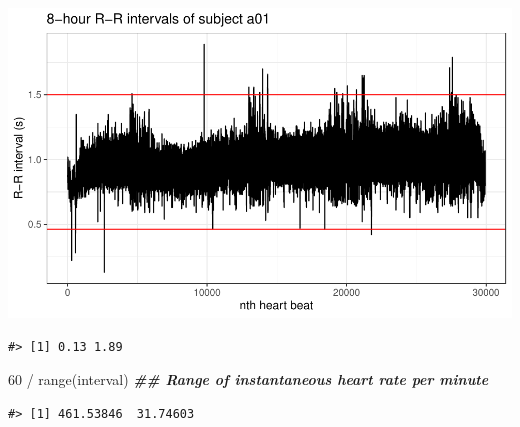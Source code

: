 \documentclass[
]{article}
\newenvironment{Shaded}{\begin{snugshade}}{\end{snugshade}}
\newcommand{\AttributeTok}[1]{\textcolor[rgb]{0.77,0.63,0.00}{#1}}
\newcommand{\DecValTok}[1]{\textcolor[rgb]{0.00,0.00,0.81}{#1}}
\newcommand{\DocumentationTok}[1]{\textcolor[rgb]{0.56,0.35,0.01}{\textbf{\textit{#1}}}}
\newcommand{\FunctionTok}[1]{\textcolor[rgb]{0.00,0.00,0.00}{#1}}
\newcommand{\NormalTok}[1]{#1}
\newcommand{\OtherTok}[1]{\textcolor[rgb]{0.56,0.35,0.01}{#1}}
\newcommand{\SpecialCharTok}[1]{\textcolor[rgb]{0.00,0.00,0.00}{#1}}
\begin{document}
\begin{center}\includegraphics{report_files/figure-latex/rr-interval-1} \end{center}

\begin{Shaded}
\end{Shaded}

\begin{verbatim}
#> [1] 0.13 1.89
\end{verbatim}

\begin{Shaded}
\begin{Highlighting}[]
\DecValTok{60} \SpecialCharTok{/} \FunctionTok{range}\NormalTok{(interval) }\DocumentationTok{\#\# Range of instantaneous heart rate per minute}
\end{Highlighting}
\end{Shaded}

\begin{verbatim}
#> [1] 461.53846  31.74603
\end{verbatim}

\begin{Shaded}
\end{Shaded}
\end{document}
